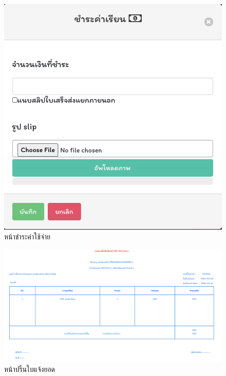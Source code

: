 \begin{itemize}
  \begin{figure}
    \begin{center}
    \includegraphics[scale=0.75]{images/UpdatePayment.png}
    \end{center}
    \caption[หน้าชำระค่าใช้จ่าย]{หน้าชำระค่าใช้จ่าย}
    \label{fig:updatePayment}
    \end{figure}

    \begin{figure}
      \begin{center}
      \includegraphics[width=\linewidth]{images/invoicePage.png}
      \end{center}
      \caption[หน้าปริ้นใบแจ้งยอด]{หน้าปริ้นใบแจ้งยอด}
      \label{fig:invoicePage}
      \end{figure}


\end{itemize}

